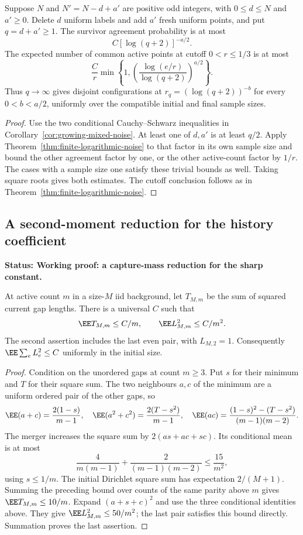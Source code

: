\documentclass[11pt,letterpaper]{article}
\newcommand{\status}[1]{\textbf{Status: #1.}}
\begin{document}
\begin{corollary}
\label{cor:mixed-logarithmic-noise}
Suppose $N$ and $N'=N-d+a'$ are positive odd integers, with
$0\le d\le N$ and $a'\ge0$. Delete $d$ uniform labels and add $a'$
fresh uniform points, and put $q=d+a'\ge1$.
The survivor agreement probability is at most
\[
 C[\log(q+2)]^{-a/2}.
\]
The expected number of common active points at cutoff $0<r\le1/3$
is at most
\[
 \frac Cr\min\left\{1,
      \left(\frac{\log(e/r)}{\log(q+2)}\right)^{a/2}\right\}.
\]
Thus $q\to\infty$ gives disjoint configurations at
$r_q=(\log(q+2))^{-b}$ for every $0<b<a/2$, uniformly over the
compatible initial and final sample sizes.
\end{corollary}
\begin{proof}
Use the two conditional Cauchy--Schwarz inequalities in
Corollary~\ref{cor:growing-mixed-noise}. At least one of $d,a'$ is
at least $q/2$. Apply Theorem~\ref{thm:finite-logarithmic-noise}
to that factor in its own sample size and bound the other agreement
factor by one, or the other active-count factor by $1/r$.
The cases with a sample size one satisfy these trivial bounds as well.
Taking square roots gives both estimates. The cutoff conclusion
follows as in Theorem~\ref{thm:finite-logarithmic-noise}.
\end{proof}

\subsection{A second-moment reduction for the history coefficient}
\label{sec:history-coefficient}

\status{Working proof: a capture-mass reduction for the sharp constant}

\begin{lemma}
\label{lem:parent-second-moment}
At active count $m$ in a size-$M$ iid background, let
$T_{M,m}$ be the sum of squared current gap lengths. There is a
universal $C$ such that
\[
 \EE T_{M,m}\le C/m,\qquad \EE L_{M,m}^2\le C/m^2.
\]
The second assertion includes the last even pair, with $L_{M,2}=1$.
Consequently $\EE\sum_e L_e^2\le C$ uniformly in the initial size.
\end{lemma}
\begin{proof}
Condition on the unordered gaps at count $m\ge3$. Put $s$ for their
minimum and $T$ for their square sum. The two neighbours $a,c$ of
the minimum are a uniform ordered pair of the other gaps, so
\[
 \EE(a+c)=\frac{2(1-s)}{m-1},\quad
 \EE(a^2+c^2)=\frac{2(T-s^2)}{m-1},\quad
 \EE(ac)=\frac{(1-s)^2-(T-s^2)}{(m-1)(m-2)}.
\]
The merger increases the square sum by $2(as+ac+sc)$. Its conditional
mean is at most
\[
 \frac4{m(m-1)}+\frac2{(m-1)(m-2)}\le\frac{15}{m^2},
\]
using $s\le1/m$. The initial Dirichlet square sum has expectation
$2/(M+1)$. Summing the preceding bound over counts of the same parity
above $m$ gives $\EE T_{M,m}\le10/m$.
Expand $(a+s+c)^2$ and use the three conditional identities above.
They give $\EE L_{M,m}^2\le50/m^2$; the last pair satisfies this
bound directly. Summation proves the last assertion.
\end{proof}
\end{document}
